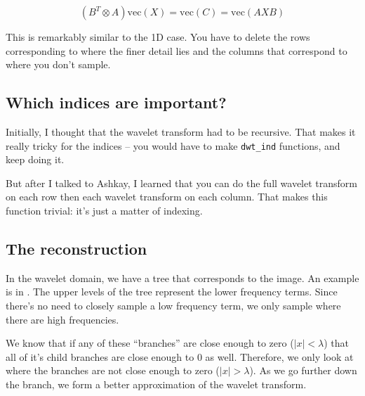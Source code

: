 \documentclass[leqno]{article}
\begin{document}
                $$(B^T \otimes A)\text{vec}(X) = \text{vec}(C) = \text{vec}(AXB) $$

                This is remarkably similar to the 1D case. You have to delete the rows corresponding to where the finer detail lies and the columns that correspond to where you don't sample.


        \subsection{Which indices are important?}
            Initially, I thought that the wavelet transform had to be recursive. That makes it really tricky for the indices -- you would have to make \texttt{dwt\_ind} functions, and keep doing it. 

            But after I talked to Ashkay, I learned that you can do the full wavelet transform on each row then each wavelet transform on each column. That makes this function trivial: it's just a matter of indexing. 

        \subsection{The reconstruction}
            In the wavelet domain, we have a tree that corresponds to the image. An example is in . The upper levels of the tree represent the lower frequency terms. Since there's no need to closely sample a low frequency term, we only sample where there are high frequencies. 

            We know that if any of these ``branches'' are close enough to zero ($|x| < \lambda$) that all of it's child branches are close enough to 0 as well. Therefore, we only look at where the branches are not close enough to zero ($|x| > \lambda$). As we go further down the branch, we form a better approximation of the wavelet transform.
            
\end{document}
